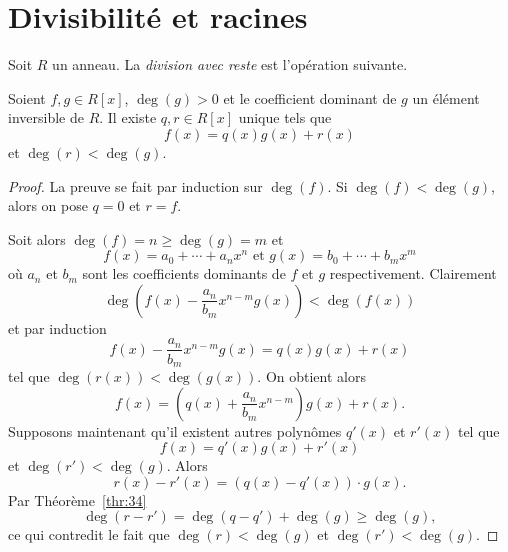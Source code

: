 \section{Divisibilité et racines} 
\label{sec:divisibilite}
Soit $R$ un anneau. La \emph{division avec reste} est l'opération suivante. 

\begin{theorem}
  \label{thr:33}
  Soient $f,g \in R[x]$, $\deg(g) >0$ et le coefficient dominant de $g$ un élément  inversible de $R$.   Il existe $q,r \in R[x]$ unique  tels que 
  \begin{displaymath}
    f(x) = q(x) g(x) + r(x) 
  \end{displaymath}
  et $\deg(r) < \deg(g)$. 
\end{theorem}


\begin{proof}
  La preuve se fait par induction sur $\deg(f)$. Si $\deg(f) < \deg(g)$, alors on pose $q = 0$ et $r = f$.

Soit alors $\deg(f) = n \geq \deg(g)=m$ et 
\begin{displaymath}
  f(x) = a_0+ \cdots +a_n x^n \text{ et } g(x) = b_0 + \cdots + b_m x^m 
\end{displaymath}
où $a_n$ et $b_m$ sont les coefficients dominants de $f$ et $g$ respectivement. 
Clairement 
\begin{displaymath}
  \deg\left( f(x) - \frac{a_n}{ b_m } x^{n-m} g(x) \right) < \deg(f(x))
\end{displaymath}
et par induction 
\begin{displaymath}
  f(x) - \frac{a_n}{ b_m } x^{n-m} g(x)  = q(x) g(x) + r(x) 
\end{displaymath}
tel que $\deg(r(x)) < \deg(g(x))$. On  obtient alors
\begin{displaymath}
  f(x) = \left(q(x) + \frac{a_n}{ b_m } x^{n-m} \right) g(x) + r(x). 
\end{displaymath}
%
Supposons maintenant qu'il existent autres polynômes $q'(x)$ et $r'(x)$ tel que 
\begin{displaymath}
    f(x) = q'(x) g(x) + r'(x) 
  \end{displaymath}
  et $\deg(r') < \deg(g)$. 
Alors 
\begin{displaymath}
   r(x) - r'(x) = (q(x) - q'(x)) ⋅ g(x). 
\end{displaymath}
Par Théorème~\ref{thr:34}
\begin{displaymath}
 \deg( r - r')  = \deg(q - q') + \deg(g) \geq \deg(g), 
\end{displaymath}
ce qui contredit le fait que $\deg(r) < \deg(g)$ et $\deg(r') < \deg(g)$. 
\end{proof}


